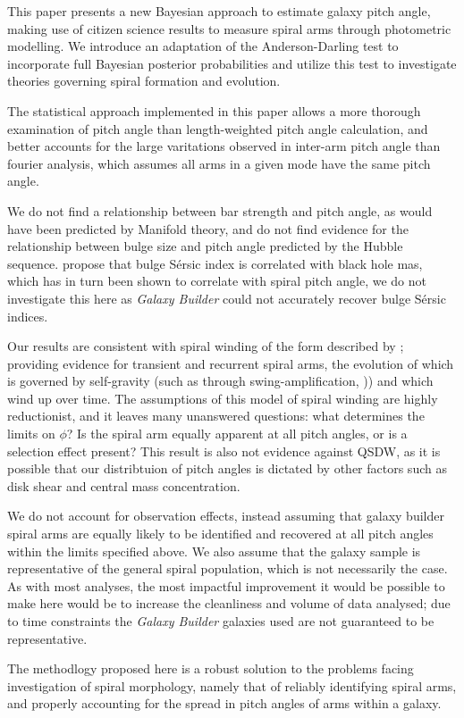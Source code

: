This paper presents a new Bayesian approach to estimate galaxy pitch angle, making use of citizen science results to measure spiral arms through photometric modelling. We introduce an adaptation of the Anderson-Darling test to incorporate full Bayesian posterior probabilities and utilize this test to investigate theories governing spiral formation and evolution.

The statistical approach implemented in this paper allows a more thorough examination of pitch angle than length-weighted pitch angle calculation, and better accounts for the large varitations observed in inter-arm pitch angle than fourier analysis, which assumes all arms in a given mode have the same pitch angle.

We do not find a relationship between bar strength and pitch angle, as would have been predicted by Manifold theory, and do not find evidence for the relationship between bulge size and pitch angle predicted by the Hubble sequence. \citet{2007ApJ...655...77G} propose that bulge S\'ersic index is correlated with black hole mas, which has in turn been shown to correlate with spiral pitch angle, we do not investigate this here as \textit{Galaxy Builder} could not accurately recover bulge S\'ersic indices.

Our results are consistent with spiral winding of the form described by \citet{2019arXiv190910291P}; providing evidence for transient and recurrent spiral arms, the evolution of which is governed by self-gravity (such as through swing-amplification, \citealt{1965MNRAS.130..125G})) and which wind up over time. The assumptions of this model of spiral winding are highly reductionist, and it leaves many unanswered questions: what determines the limits on $\phi$? Is the spiral arm equally apparent at all pitch angles, or is a selection effect present? This result is also not evidence against QSDW, as it is possible that our distribtuion of pitch angles is dictated by other factors such as disk shear and central mass concentration.

We do not account for observation effects, instead assuming that galaxy builder spiral arms are equally likely to be identified and recovered at all pitch angles within the limits specified above. We also assume that the galaxy sample is representative of the general spiral population, which is not necessarily the case. As with most analyses, the most impactful improvement it would be possible to make here would be to increase the cleanliness and volume of data analysed; due to time constraints the \textit{Galaxy Builder} galaxies used are not guaranteed to be representative.

The methodlogy proposed here is a robust solution to the problems facing investigation of spiral morphology, namely that of reliably identifying spiral arms, and properly accounting for the spread in pitch angles of arms within a galaxy.
